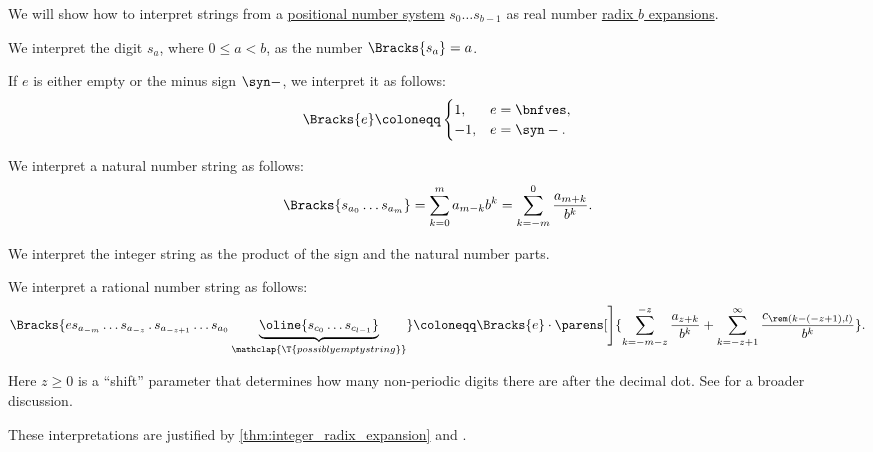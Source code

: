 \begin{definition}\label{def:positional_notation_as_radix_expansion}\mimprovised
  We will show how to interpret strings from a \hyperref[def:positional_number_system]{positional number system} \( s_0 \ldots s_{b-1} \) as real number \hyperref[def:real_number_radix_expansion]{radix \( b \) expansions}.

  \begin{thmenum}
     We interpret the digit \( s_a \), where \( 0 \leq a < b \), as the number \( \Bracks{s_a} = a \).

     If \( e \) is either empty or the minus sign \( \syn- \), we interpret it as follows:
    \begin{equation*}
      \Bracks{e} \coloneqq \begin{cases}
        1,  &e = \bnfves, \\
        -1, &e = \syn-.
      \end{cases}
    \end{equation*}

     We interpret a natural number string as follows:
    \begin{equation*}
      \Bracks{s_{a_0} \ldots s_{a_m}} = \sum_{k=0}^m a_{m-k} b^k = \sum_{k=-m}^0 \frac {a_{m+k}} {b^k}.
    \end{equation*}

     We interpret the integer string as the product of the sign and the natural number parts.

     We interpret a rational number string as follows:
    \small
    \begin{equation*}
      \Bracks{e s_{a_{-m}} \ldots s_{a_{-z}} \thinspace . \thinspace s_{a_{-z+1}} \ldots s_{a_0} \underbrace{\oline{s_{c_0} \ldots s_{c_{l-1}}}}_{\mathclap{\T{possibly empty string}}}} \coloneqq \Bracks{e} \cdot \parens[\Bigg]{ \sum_{k=-m-z}^{-z} \frac {a_{z+k}} {b^k} + \sum_{k=-z + 1}^\infty \frac {c_{\rem(k - (-z + 1), l)}} {b^k} }.
    \end{equation*}
    \normalsize

    Here \( z \geq 0 \) is a \enquote{shift} parameter that determines how many non-periodic digits there are after the decimal dot. See  for a broader discussion.
  \end{thmenum}
\end{definition}
\begin{comments}
  \item These interpretations are justified by \cref{thm:integer_radix_expansion} and .
\end{comments}

